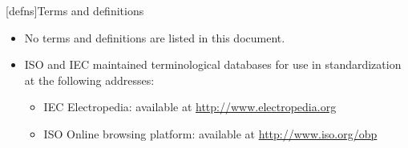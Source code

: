 
[defns]{Terms and definitions}

\begin{itemize}
\item No terms and definitions are listed in this document.
\item ISO and IEC maintained terminological databases for use in standardization at the following addresses:
  \begin{itemize}
    \item IEC Electropedia: available at \url{http://www.electropedia.org}
    \item ISO Online browsing platform: available at \url{http://www.iso.org/obp}
  \end{itemize}
\end{itemize}
